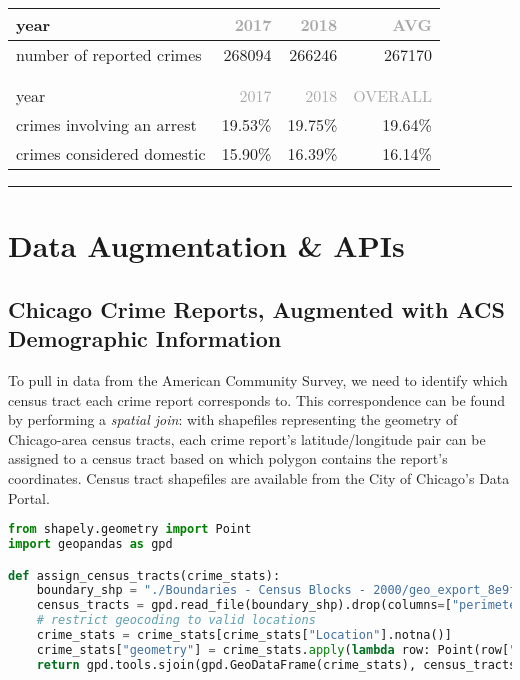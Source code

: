 \documentclass[11pt]{article}
\newcommand{\printsubsection}[1]{\normalfont\headerfontlt\textcolor{darkgray}{{#1}}}
\newcommand{\opns}[1]{\textrm{\small\printsubsection{\MakeUppercase{#1}}}}
\begin{document}
\begin{table}[H]
\centering \renewcommand{\arraystretch}{1.2}
\begin{tabular}{lrrr}
\multicolumn{1}{l|}{year} &    \opns{2017} &    \opns{2018} &     \opns{AVG} \\\hline
\multicolumn{1}{l|}{number of reported crimes} &  268094 &  266246 &  267170 \\
\\ \\
\multicolumn{1}{l|}{year} &       \opns{2017} &  \opns{2018} &  \opns{OVERALL} \\\hline
\multicolumn{1}{l|}{crimes involving an arrest}   &  19.53\% &  19.75\% &  19.64\% \\
\multicolumn{1}{l|}{crimes considered domestic}   &  15.90\% &  16.39\% &  16.14\% 
\end{tabular}
\end{table}


{\centering
\hspace{-1in}
\vspace{4ex}\hrule\vspace{4ex}
\hspace{-1in}
\par}
\section{Data Augmentation \& APIs}
\subsection{Chicago Crime Reports, Augmented with ACS Demographic Information}
To pull in data from the American Community Survey, we need to identify which census tract each crime report corresponds to. This correspondence can be found by performing a \textit{spatial join}: with shapefiles representing the geometry of Chicago-area census tracts, each crime report's latitude/longitude pair can be assigned to a census tract based on which polygon contains the report's coordinates. Census tract shapefiles are available from the City of Chicago's Data Portal.
\begin{lstlisting}[language=Python,numbers=none]
from shapely.geometry import Point
import geopandas as gpd

def assign_census_tracts(crime_stats):
    boundary_shp = "./Boundaries - Census Blocks - 2000/geo_export_8e9f6d85-3c5b-429f-b625-25afcc3dea85.shp"
    census_tracts = gpd.read_file(boundary_shp).drop(columns=["perimeter", "shape_area", "shape_len"])
    # restrict geocoding to valid locations
    crime_stats = crime_stats[crime_stats["Location"].notna()]
    crime_stats["geometry"] = crime_stats.apply(lambda row: Point(row["Longitude"], row["Latitude"]), axis = 1)
    return gpd.tools.sjoin(gpd.GeoDataFrame(crime_stats), census_tracts, how="inner")
\end{lstlisting}
\end{document}
